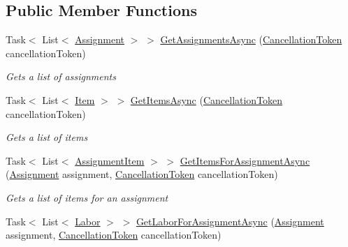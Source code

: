\subsection*{Public Member Functions}
\begin{DoxyCompactItemize}
\item 
Task$<$ List$<$ \hyperlink{class_field_service_1_1_data_1_1_assignment}{Assignment} $>$ $>$ \hyperlink{class_field_service_1_1_tests_1_1_mocks_1_1_mock_assignment_service_a68742aa4b2182799daa9fc1222fda800}{Get\+Assignments\+Async} (\hyperlink{_view_models_2_assignment_view_model_8cs_aba80ec766846c61f55644fd23860cb18}{Cancellation\+Token} cancellation\+Token)
\begin{DoxyCompactList}\small\item\em Gets a list of assignments \end{DoxyCompactList}\item 
Task$<$ List$<$ \hyperlink{class_field_service_1_1_data_1_1_item}{Item} $>$ $>$ \hyperlink{class_field_service_1_1_tests_1_1_mocks_1_1_mock_assignment_service_a4857593a175265468cab792ad1518012}{Get\+Items\+Async} (\hyperlink{_view_models_2_assignment_view_model_8cs_aba80ec766846c61f55644fd23860cb18}{Cancellation\+Token} cancellation\+Token)
\begin{DoxyCompactList}\small\item\em Gets a list of items \end{DoxyCompactList}\item 
Task$<$ List$<$ \hyperlink{class_field_service_1_1_data_1_1_assignment_item}{Assignment\+Item} $>$ $>$ \hyperlink{class_field_service_1_1_tests_1_1_mocks_1_1_mock_assignment_service_a6f03c5da3c02efbb14ce194d52fa8908}{Get\+Items\+For\+Assignment\+Async} (\hyperlink{class_field_service_1_1_data_1_1_assignment}{Assignment} assignment, \hyperlink{_view_models_2_assignment_view_model_8cs_aba80ec766846c61f55644fd23860cb18}{Cancellation\+Token} cancellation\+Token)
\begin{DoxyCompactList}\small\item\em Gets a list of items for an assignment \end{DoxyCompactList}\item 
Task$<$ List$<$ \hyperlink{class_field_service_1_1_data_1_1_labor}{Labor} $>$ $>$ \hyperlink{class_field_service_1_1_tests_1_1_mocks_1_1_mock_assignment_service_acf4627b7a391bfd140188aebfd514a4b}{Get\+Labor\+For\+Assignment\+Async} (\hyperlink{class_field_service_1_1_data_1_1_assignment}{Assignment} assignment, \hyperlink{_view_models_2_assignment_view_model_8cs_aba80ec766846c61f55644fd23860cb18}{Cancellation\+Token} cancellation\+Token)

\end{DoxyCompactItemize}
